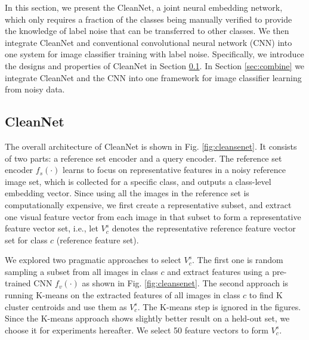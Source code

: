 \documentclass[10pt,twocolumn,letterpaper]{article}
\begin{document}
In this section, we present the CleanNet, a joint neural embedding network, which only requires a fraction of the classes being manually verified to provide the knowledge of label noise that can be transferred to other classes. We then integrate CleanNet and conventional convolutional neural network (CNN) into one system for image classifier training with label noise.  Specifically, we introduce the designs and properties of CleanNet in Section \ref{sec:denoisenet}. In Section \ref{sec:combine} we integrate CleanNet and the CNN into one framework for image classifier learning from noisy data.

\subsection{CleanNet}
\label{sec:denoisenet}
The overall architecture of CleanNet is shown in Fig. \ref{fig:cleansenet}. It consists of two parts: a reference set encoder and a query encoder. The reference set encoder $f_s(\cdot)$ learns to focus on representative features in a noisy reference image set, which is collected for a specific class, and outputs a class-level embedding vector. Since using all the images in the reference set is computationally expensive, we first create a representative subset, and extract one visual feature vector from each image in that subset to form a representative feature vector set, i.e., let $V_c^s$ denotes the representative reference feature vector set for class $c$ (reference feature set). 

We explored two pragmatic approaches to select $V_c^s$. The first one is random sampling a subset from all images in class $c$ and extract features using a pre-trained CNN $f_v(\cdot)$ as shown in Fig. \ref{fig:cleansenet}. The second approach is running K-means on the extracted features of all images in class $c$ to find K cluster centroids and use them as $V_c^s$. The K-means step is ignored in the figures. Since the K-means approach shows slightly better result on a held-out set, we choose it for experiments hereafter. We select 50 feature vectors to form $V_c^s$.
\end{document}

